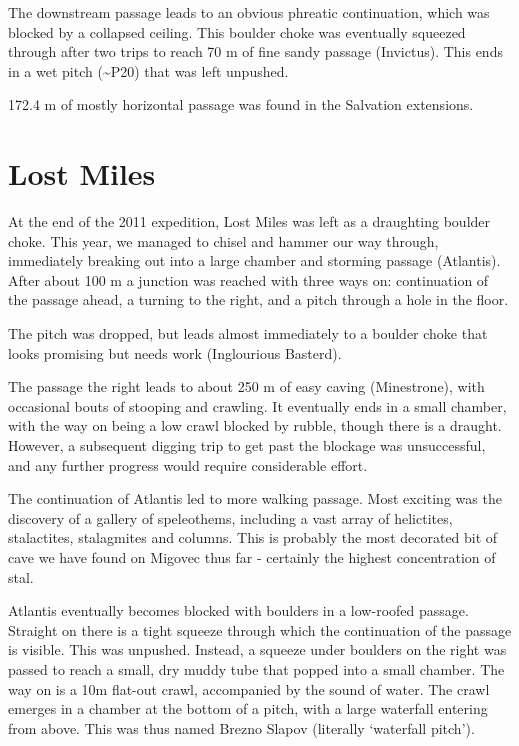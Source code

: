 The downstream passage leads to an obvious phreatic continuation, which
was blocked by a collapsed ceiling. This boulder choke was eventually
squeezed through after two trips to reach 70 m of fine sandy passage
(Invictus). This ends in a wet pitch (\textasciitilde{}P20) that was
left unpushed.

172.4 m of mostly horizontal passage was found in the Salvation
extensions.

\hypertarget{lost-miles}{%
\section{Lost Miles}\label{lost-miles}}

At the end of the 2011 expedition, Lost Miles was left as a draughting
boulder choke. This year, we managed to chisel and hammer our way
through, immediately breaking out into a large chamber and storming
passage (Atlantis). After about 100 m a junction was reached with three
ways on: continuation of the passage ahead, a turning to the right, and
a pitch through a hole in the floor.

The pitch was dropped, but leads almost immediately to a boulder choke
that looks promising but needs work (Inglourious Basterd).

The passage the right leads to about 250 m of easy caving (Minestrone),
with occasional bouts of stooping and crawling. It eventually ends in a
small chamber, with the way on being a low crawl blocked by rubble,
though there is a draught. However, a subsequent digging trip to get
past the blockage was unsuccessful, and any further progress would
require considerable effort.

The continuation of Atlantis led to more walking passage. Most exciting
was the discovery of a gallery of speleothems, including a vast array of
helictites, stalactites, stalagmites and columns. This is probably the
most decorated bit of cave we have found on Migovec thus far - certainly
the highest concentration of stal.

Atlantis eventually becomes blocked with boulders in a low-roofed
passage. Straight on there is a tight squeeze through which the
continuation of the passage is visible. This was unpushed. Instead, a
squeeze under boulders on the right was passed to reach a small, dry
muddy tube that popped into a small chamber. The way on is a 10m
flat-out crawl, accompanied by the sound of water. The crawl emerges in
a chamber at the bottom of a pitch, with a large waterfall entering from
above. This was thus named Brezno Slapov (literally `waterfall pitch').

